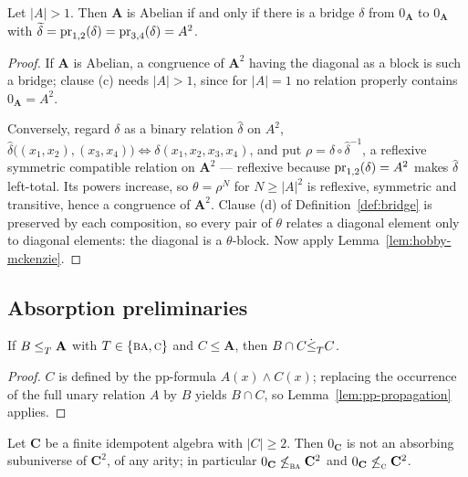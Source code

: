 \begin{lemma}\label{lem:bridge-abelian}
Let $|A|>1$. Then $\mathbf A$ is Abelian if and only if there is a bridge
$\delta$ from $0_{\mathbf A}$ to $0_{\mathbf A}$ with
$\widetilde{\delta}=\operatorname*{pr}_{1,2}(\delta)=\operatorname*{pr}_{3,4}(\delta)=A^{2}$.
\end{lemma}

\begin{proof}
If $\mathbf A$ is Abelian, a congruence of $\mathbf A^{2}$ having the diagonal
as a block is such a bridge; clause (c) needs $|A|>1$, since for $|A|=1$ no
relation properly contains $0_{\mathbf A}=A^{2}$.

Conversely, regard $\delta$ as a binary relation $\hat\delta$ on $A^{2}$,
$\hat\delta\bigl((x_{1},x_{2}),(x_{3},x_{4})\bigr)\iff\delta(x_{1},x_{2},
x_{3},x_{4})$, and put $\rho=\hat\delta\circ\hat\delta^{-1}$, a reflexive
symmetric compatible relation on $\mathbf A^{2}$ --- reflexive because
$\operatorname*{pr}_{1,2}(\delta)=A^{2}$ makes $\hat\delta$ left-total. Its powers increase,
so $\theta=\rho^{N}$ for $N\ge|A|^{2}$ is reflexive, symmetric and transitive,
hence a congruence of $\mathbf A^{2}$. Clause (d) of
Definition~\ref{def:bridge} is preserved by each composition, so every pair of
$\theta$ relates a diagonal element only to diagonal elements: the diagonal is
a $\theta$-block. Now apply Lemma~\ref{lem:hobby-mckenzie}.
\end{proof}

\subsection{Absorption preliminaries}\label{sec:abs-prelim}

\begin{lemma}\label{lem:ba-center-intersect}
If $B\le_{T}^{}\mathbf A$ with $T\in\{\textup{\textsc{ba}},\textup{\textsc{c}}\}$ and $C\le\mathbf A$, then
$B\cap C\dot\le_{T}^{}C$.
\end{lemma}

\begin{proof}
$C$ is defined by the pp-formula $A(x)\wedge C(x)$; replacing the occurrence of
the full unary relation $A$ by $B$ yields $B\cap C$, so
Lemma~\ref{lem:pp-propagation} applies.
\end{proof}

\begin{lemma}\label{lem:no-absorbing-diagonal}
Let $\mathbf C$ be a finite idempotent algebra with $|C|\ge 2$. Then
$0_{\mathbf C}$ is not an absorbing subuniverse of $\mathbf C^{2}$, of any
arity; in particular $0_{\mathbf C}\not\le_{\textup{\textsc{ba}}}^{}\mathbf C^{2}$ and
$0_{\mathbf C}\not\le_{\textup{\textsc{c}}}^{}\mathbf C^{2}$.
\end{lemma}

